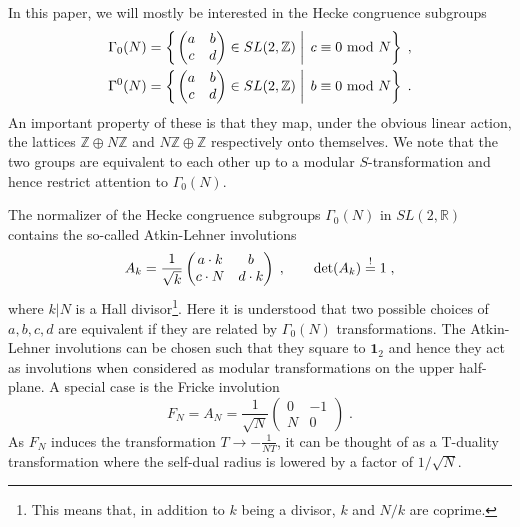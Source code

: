\documentclass[11pt,a4paper]{article}
\numberwithin{equation}{section}
\numberwithin{table}{section}\setlength{\multlinegap}{25pt}
\begin{document}
In this paper, we will mostly be interested in the Hecke congruence subgroups
\begin{equation}
    \begin{aligned}
        \Gamma_0(N)&=\left\{\left.\begin{pmatrix}a&b\\c&d\end{pmatrix}\in SL(2,\mathbb{Z})\;\right|\;c\equiv 0 \textup{ mod } N\right\}\;,\\
        \Gamma^0(N)&=\left\{\left.\begin{pmatrix}a&b\\c&d\end{pmatrix}\in SL(2,\mathbb{Z})\;\right|\;b\equiv 0 \textup{ mod } N\right\}\;.
    \end{aligned}
\end{equation}
An important property of these is that they map, under the obvious linear action, the lattices $\mathbb{Z}\oplus N\mathbb{Z}$ and $N\mathbb{Z}\oplus \mathbb{Z}$ respectively onto themselves. We note that the two groups are equivalent to each other up to a modular $S$-transformation and hence restrict attention to $\Gamma_0(N)$.

The normalizer of the Hecke congruence subgroups $\Gamma_0(N)$ in $SL(2,\mathbb{R})$ contains the so-called Atkin-Lehner involutions
\begin{equation}
    A_k=\frac{1}{\sqrt{k}}\begin{pmatrix}
        a\cdot k & b\\
        c\cdot N & d\cdot k
    \end{pmatrix}\;,\qquad \textup{det}(A_k)\overset{!}{=}1\;,
\end{equation}
where $k|N$ is a Hall divisor\footnote{This means that, in addition to $k$ being a divisor, $k$ and $N/k$ are coprime.}. Here it is understood that two possible choices of $a,b,c,d$ are equivalent if they are related by $\Gamma_0(N)$ transformations. The Atkin-Lehner involutions can be chosen such that they square to $\boldsymbol{1}_2$ and hence they act as involutions when considered as modular transformations on the upper half-plane. A special case is the Fricke involution
\begin{equation}
    F_N=A_N=\frac{1}{\sqrt{N}}
        \begin{pmatrix}
            0 & -1\\
            N & 0
        \end{pmatrix}\;.
\end{equation}
As $F_N$ induces the transformation $T\to-\frac{1}{NT}$, it can be thought of as a T-duality transformation where the self-dual radius is lowered by a factor of $1/\sqrt{N}$.
\end{document}
